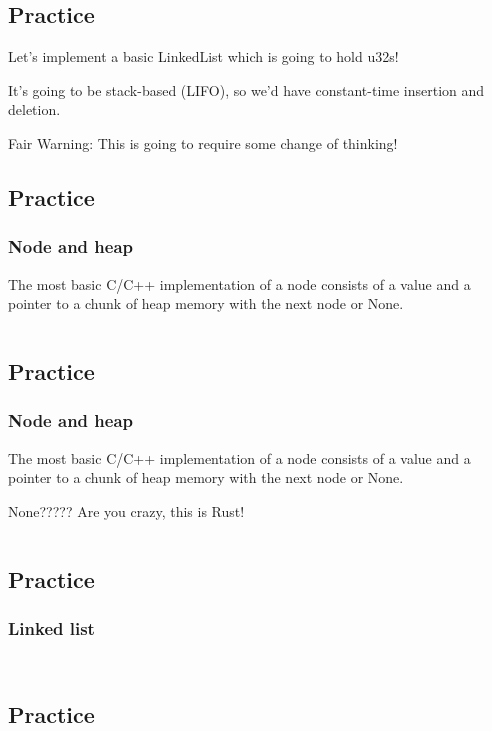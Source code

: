 \documentclass[usenames,twocolumn,dvipsnames,10pt,a4wide]{article}
\begin{document}
\subsection{Practice}
\large
Let's implement a basic LinkedList which is going to
hold u32s!


It's going to be stack-based (LIFO), so we'd have
constant-time insertion and deletion.


Fair Warning: This is going to require some change of thinking!


\subsection{Practice}
\subsubsection{Node and heap}
\large
The most basic C/C++ implementation of a node
consists of a value and a pointer to a chunk of
heap memory with the next node or None.

\inputminted[fontsize=\normalsize]{rust}{code/list1.rs}


\subsection{Practice}
\subsubsection{Node and heap}
\large
The most basic C/C++ implementation of a node
consists of a value and a pointer to a chunk of
heap memory with the next node or None.

None????? Are you crazy, this is Rust!

\inputminted[fontsize=\normalsize]{rust}{code/list2.rs}


\subsection{Practice}
\subsubsection{Linked list}
\inputminted[fontsize=\normalsize]{rust}{code/list3.rs}

\inputminted[fontsize=\normalsize]{rust}{code/list4.rs}



\subsection{Practice}
\end{document}
